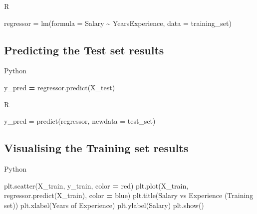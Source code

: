 \documentclass[
]{book}
\newenvironment{Shaded}{\begin{snugshade}}{\end{snugshade}}
\newcommand{\AttributeTok}[1]{\textcolor[rgb]{0.77,0.63,0.00}{#1}}
\newcommand{\FunctionTok}[1]{\textcolor[rgb]{0.00,0.00,0.00}{#1}}
\newcommand{\NormalTok}[1]{#1}
\newcommand{\OperatorTok}[1]{\textcolor[rgb]{0.81,0.36,0.00}{\textbf{#1}}}
\newcommand{\OtherTok}[1]{\textcolor[rgb]{0.56,0.35,0.01}{#1}}
\newcommand{\SpecialCharTok}[1]{\textcolor[rgb]{0.00,0.00,0.00}{#1}}
\newcommand{\StringTok}[1]{\textcolor[rgb]{0.31,0.60,0.02}{#1}}
\theoremstyle{definition}
\theoremstyle{definition}
\theoremstyle{definition}
\theoremstyle{definition}
\theoremstyle{remark}
\begin{document}
R

\begin{Shaded}
\begin{Highlighting}[]
\NormalTok{regressor }\OtherTok{=} \FunctionTok{lm}\NormalTok{(}\AttributeTok{formula =}\NormalTok{ Salary }\SpecialCharTok{\textasciitilde{}}\NormalTok{ YearsExperience,}
               \AttributeTok{data =}\NormalTok{ training\_set)}
\end{Highlighting}
\end{Shaded}

\hypertarget{predicting-the-test-set-results}{%
\subsection{Predicting the Test set results}\label{predicting-the-test-set-results}}

Python

\begin{Shaded}
\begin{Highlighting}[]
\NormalTok{y\_pred }\OperatorTok{=}\NormalTok{ regressor.predict(X\_test)}
\end{Highlighting}
\end{Shaded}

R

\begin{Shaded}
\begin{Highlighting}[]
\NormalTok{y\_pred }\OtherTok{=} \FunctionTok{predict}\NormalTok{(regressor, }\AttributeTok{newdata =}\NormalTok{ test\_set)}
\end{Highlighting}
\end{Shaded}

\hypertarget{visualising-the-training-set-results}{%
\subsection{Visualising the Training set results}\label{visualising-the-training-set-results}}

Python

\begin{Shaded}
\begin{Highlighting}[]
\NormalTok{plt.scatter(X\_train, y\_train, color }\OperatorTok{=} \StringTok{\textquotesingle{}red\textquotesingle{}}\NormalTok{)}
\NormalTok{plt.plot(X\_train, regressor.predict(X\_train), color }\OperatorTok{=} \StringTok{\textquotesingle{}blue\textquotesingle{}}\NormalTok{)}
\NormalTok{plt.title(}\StringTok{\textquotesingle{}Salary vs Experience (Training set)\textquotesingle{}}\NormalTok{)}
\NormalTok{plt.xlabel(}\StringTok{\textquotesingle{}Years of Experience\textquotesingle{}}\NormalTok{)}
\NormalTok{plt.ylabel(}\StringTok{\textquotesingle{}Salary\textquotesingle{}}\NormalTok{)}
\NormalTok{plt.show()}
\end{Highlighting}
\end{Shaded}
\end{document}
